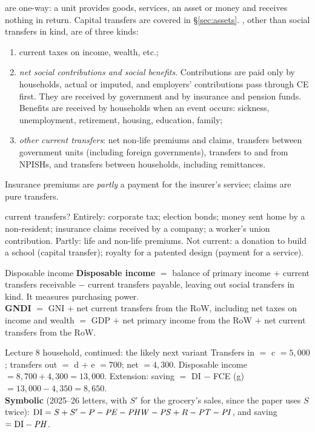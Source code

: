  are one-way: a unit provides goods, services, an asset or money and receives
nothing in return. Capital transfers are covered in \S\ref{sec:assets}.
, other than social transfers in kind, are of three kinds:
\begin{enumerate}
\item current taxes on income, wealth, etc.;
\item \emph{net social contributions and social benefits}. Contributions are paid only by
  households, actual or imputed, and employers' contributions pass through CE first. They are
  received by government and by insurance and pension funds. Benefits are received by households
  when an event occurs: sickness, unemployment, retirement, housing, education, family;
\item \emph{other current transfers}: net non-life premiums and claims, transfers between
  government units (including foreign governments), transfers to and from NPISHs, and transfers
  between households, including remittances.
\end{enumerate}
Insurance premiums are \emph{partly} a payment for the insurer's service; claims are pure transfers.

\begin{quick}{current transfers?}
\small Entirely: corporate tax; election bonds; money sent home by a non-resident; insurance claims
received by a company; a worker's union contribution. Partly: life and non-life premiums. Not
current: a donation to build a school (capital transfer); royalty for a patented design (payment
for a service).
\end{quick}

\begin{keybox}{Disposable income}
\small \textbf{Disposable income} $=$ balance of primary income $+$ current transfers receivable
$-$ current transfers payable, leaving out social transfers in kind. It measures purchasing power.\\
\textbf{GNDI} $=$ GNI $+$ net current transfers from the RoW, including net taxes on income and
wealth $=$ GDP $+$ net primary income from the RoW $+$ net current transfers from the RoW.
\end{keybox}

\begin{tmpl}{Lecture 8 household, continued: the likely next variant}
\small Transfers in $=$ c $=5{,}000$; transfers out $=$ d $+$ e $=700$; net $=4{,}300$.
Disposable income $=8{,}700+4{,}300=13{,}000$. Extension: saving $=$ DI $-$ FCE (g)
$=13{,}000-4{,}350=8{,}650$.\\
\textbf{Symbolic} (2025--26 letters, with $S'$ for the grocery's sales, since the paper uses $S$
twice): $\text{DI}=S+S'-P-\mathit{PE}-\mathit{PHW}-\mathit{PS}+R-\mathit{PT}-\mathit{PI}$, and saving
$=\text{DI}-\mathit{PH}$.
\end{tmpl}

